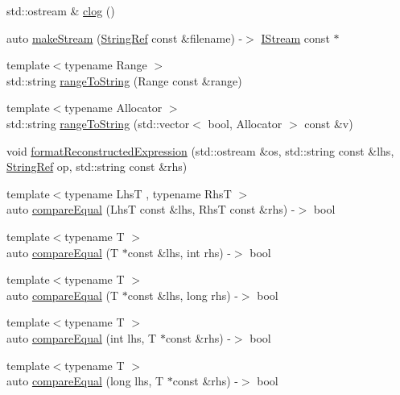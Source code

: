 \begin{DoxyCompactItemize}
std\+::ostream \& \mbox{\hyperlink{namespace_catch_a5a0677089050dcdb4848f56fb47e9279}{clog}} ()
\item 
auto \mbox{\hyperlink{namespace_catch_af6d27462573d60c30c51acf1c980e3ff}{make\+Stream}} (\mbox{\hyperlink{class_catch_1_1_string_ref}{String\+Ref}} const \&filename) -\/$>$ \mbox{\hyperlink{struct_catch_1_1_i_stream}{I\+Stream}} const $\ast$
\item 
{\footnotesize template$<$typename Range $>$ }\\std\+::string \mbox{\hyperlink{namespace_catch_af13494e925a793e3e7143c6ce6f442c2}{range\+To\+String}} (Range const \&range)
\item 
{\footnotesize template$<$typename Allocator $>$ }\\std\+::string \mbox{\hyperlink{namespace_catch_ae162dc66b7767a52e7e4283915fd3d9f}{range\+To\+String}} (std\+::vector$<$ bool, Allocator $>$ const \&v)
\item 
void \mbox{\hyperlink{namespace_catch_a520110c31f26cf9892595772ab814fc0}{format\+Reconstructed\+Expression}} (std\+::ostream \&os, std\+::string const \&lhs, \mbox{\hyperlink{class_catch_1_1_string_ref}{String\+Ref}} op, std\+::string const \&rhs)
\item 
{\footnotesize template$<$typename LhsT , typename RhsT $>$ }\\auto \mbox{\hyperlink{namespace_catch_af89b8df30cfaf09abd048c6ff67359ee}{compare\+Equal}} (LhsT const \&lhs, RhsT const \&rhs) -\/$>$ bool
\item 
{\footnotesize template$<$typename T $>$ }\\auto \mbox{\hyperlink{namespace_catch_a68f451c45e65f242dde5f21c19a4cf7a}{compare\+Equal}} (T $\ast$const \&lhs, int rhs) -\/$>$ bool
\item 
{\footnotesize template$<$typename T $>$ }\\auto \mbox{\hyperlink{namespace_catch_afca4a005e1053c542462dc7a603b41b3}{compare\+Equal}} (T $\ast$const \&lhs, long rhs) -\/$>$ bool
\item 
{\footnotesize template$<$typename T $>$ }\\auto \mbox{\hyperlink{namespace_catch_a6af99378569fc6f68270b6af669f1c3b}{compare\+Equal}} (int lhs, T $\ast$const \&rhs) -\/$>$ bool
\item 
{\footnotesize template$<$typename T $>$ }\\auto \mbox{\hyperlink{namespace_catch_a72f10ec2cad6db16029d48c8c1d9df2f}{compare\+Equal}} (long lhs, T $\ast$const \&rhs) -\/$>$ bool
\item 

\end{DoxyCompactItemize}

